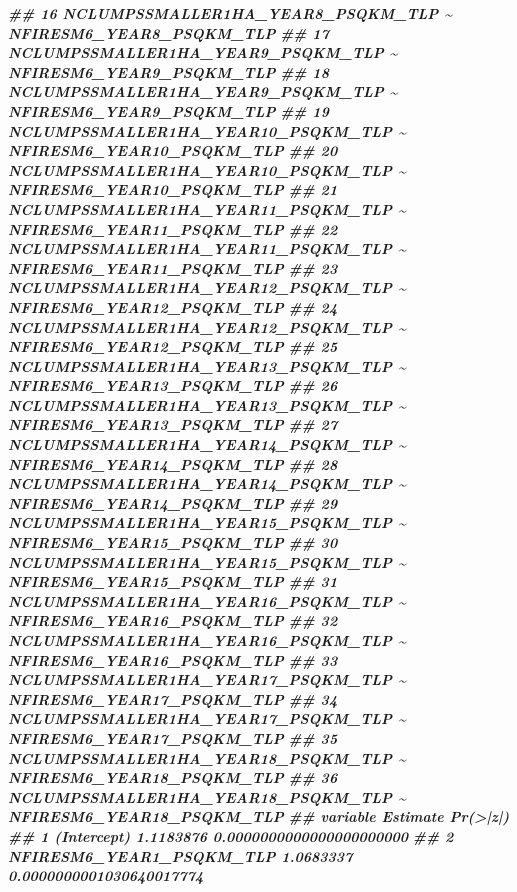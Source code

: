 \documentclass[10pt,landscape,a3paper]{article}
\newenvironment{Shaded}{\begin{snugshade}}{\end{snugshade}}
\newcommand{\DocumentationTok}[1]{\textcolor[rgb]{0.56,0.35,0.01}{\textbf{\textit{#1}}}}
\begin{document}
\begin{Shaded}
\begin{Highlighting}[]
\DocumentationTok{\#\# 16   NCLUMPSSMALLER1HA\_YEAR8\_PSQKM\_TLP \textasciitilde{} NFIRESM6\_YEAR8\_PSQKM\_TLP}
\DocumentationTok{\#\# 17   NCLUMPSSMALLER1HA\_YEAR9\_PSQKM\_TLP \textasciitilde{} NFIRESM6\_YEAR9\_PSQKM\_TLP}
\DocumentationTok{\#\# 18   NCLUMPSSMALLER1HA\_YEAR9\_PSQKM\_TLP \textasciitilde{} NFIRESM6\_YEAR9\_PSQKM\_TLP}
\DocumentationTok{\#\# 19 NCLUMPSSMALLER1HA\_YEAR10\_PSQKM\_TLP \textasciitilde{} NFIRESM6\_YEAR10\_PSQKM\_TLP}
\DocumentationTok{\#\# 20 NCLUMPSSMALLER1HA\_YEAR10\_PSQKM\_TLP \textasciitilde{} NFIRESM6\_YEAR10\_PSQKM\_TLP}
\DocumentationTok{\#\# 21 NCLUMPSSMALLER1HA\_YEAR11\_PSQKM\_TLP \textasciitilde{} NFIRESM6\_YEAR11\_PSQKM\_TLP}
\DocumentationTok{\#\# 22 NCLUMPSSMALLER1HA\_YEAR11\_PSQKM\_TLP \textasciitilde{} NFIRESM6\_YEAR11\_PSQKM\_TLP}
\DocumentationTok{\#\# 23 NCLUMPSSMALLER1HA\_YEAR12\_PSQKM\_TLP \textasciitilde{} NFIRESM6\_YEAR12\_PSQKM\_TLP}
\DocumentationTok{\#\# 24 NCLUMPSSMALLER1HA\_YEAR12\_PSQKM\_TLP \textasciitilde{} NFIRESM6\_YEAR12\_PSQKM\_TLP}
\DocumentationTok{\#\# 25 NCLUMPSSMALLER1HA\_YEAR13\_PSQKM\_TLP \textasciitilde{} NFIRESM6\_YEAR13\_PSQKM\_TLP}
\DocumentationTok{\#\# 26 NCLUMPSSMALLER1HA\_YEAR13\_PSQKM\_TLP \textasciitilde{} NFIRESM6\_YEAR13\_PSQKM\_TLP}
\DocumentationTok{\#\# 27 NCLUMPSSMALLER1HA\_YEAR14\_PSQKM\_TLP \textasciitilde{} NFIRESM6\_YEAR14\_PSQKM\_TLP}
\DocumentationTok{\#\# 28 NCLUMPSSMALLER1HA\_YEAR14\_PSQKM\_TLP \textasciitilde{} NFIRESM6\_YEAR14\_PSQKM\_TLP}
\DocumentationTok{\#\# 29 NCLUMPSSMALLER1HA\_YEAR15\_PSQKM\_TLP \textasciitilde{} NFIRESM6\_YEAR15\_PSQKM\_TLP}
\DocumentationTok{\#\# 30 NCLUMPSSMALLER1HA\_YEAR15\_PSQKM\_TLP \textasciitilde{} NFIRESM6\_YEAR15\_PSQKM\_TLP}
\DocumentationTok{\#\# 31 NCLUMPSSMALLER1HA\_YEAR16\_PSQKM\_TLP \textasciitilde{} NFIRESM6\_YEAR16\_PSQKM\_TLP}
\DocumentationTok{\#\# 32 NCLUMPSSMALLER1HA\_YEAR16\_PSQKM\_TLP \textasciitilde{} NFIRESM6\_YEAR16\_PSQKM\_TLP}
\DocumentationTok{\#\# 33 NCLUMPSSMALLER1HA\_YEAR17\_PSQKM\_TLP \textasciitilde{} NFIRESM6\_YEAR17\_PSQKM\_TLP}
\DocumentationTok{\#\# 34 NCLUMPSSMALLER1HA\_YEAR17\_PSQKM\_TLP \textasciitilde{} NFIRESM6\_YEAR17\_PSQKM\_TLP}
\DocumentationTok{\#\# 35 NCLUMPSSMALLER1HA\_YEAR18\_PSQKM\_TLP \textasciitilde{} NFIRESM6\_YEAR18\_PSQKM\_TLP}
\DocumentationTok{\#\# 36 NCLUMPSSMALLER1HA\_YEAR18\_PSQKM\_TLP \textasciitilde{} NFIRESM6\_YEAR18\_PSQKM\_TLP}
\DocumentationTok{\#\#                     variable  Estimate                 Pr(\textgreater{}|z|)}
\DocumentationTok{\#\# 1                (Intercept) 1.1183876 0.0000000000000000000000}
\DocumentationTok{\#\# 2   NFIRESM6\_YEAR1\_PSQKM\_TLP 1.0683337 0.0000000001030640017774}

\end{Highlighting}
\end{Shaded}
\end{document}
